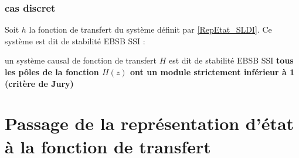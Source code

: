 \subsubsection{\Large{cas discret}}
Soit $h$ la fonction de transfert du système définit par \eqref{RepEtat_SLDI}. Ce système est dit de stabilité EBSB SSI : \newline
\begin{center}
    \Large{}
\end{center}
un système causal de fonction de transfert $H$ est dit de stabilité EBSB SSI \textbf{tous les pôles de la fonction $H(z)$ ont un module strictement inférieur à 1 (critère de Jury)}
\newpage
\section{Passage de la représentation d'état à la fonction de transfert}
